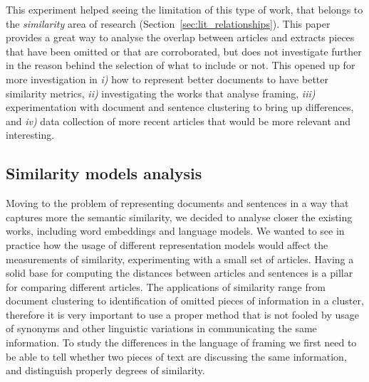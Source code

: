 

This experiment helped seeing the limitation of this type of work, that belongs to the \emph{similarity} area of research (Section~\ref{sec:lit_relationships}).
This paper provides a great way to analyse the overlap between articles and extracts pieces that have been omitted or that are corroborated, but does not investigate further in the reason behind the selection of what to include or not.
This opened up for more investigation in \emph{i)} how to represent better documents to have better similarity metrics, \emph{ii)} investigating the works that analyse framing, \emph{iii)} experimentation with document and sentence clustering to bring up differences, and \emph{iv)} data collection of more recent articles that would be more relevant and interesting.


\subsection{Similarity models analysis}
Moving to the problem of representing documents and sentences in a way that captures more the semantic similarity, we decided to analyse closer the existing works, including word embeddings and language models.
We wanted to see in practice how the usage of different representation models would affect the measurements of similarity, experimenting with a small set of articles. 
Having a solid base for computing the distances between articles and sentences is a pillar for comparing different articles. The applications of similarity range from document clustering to identification of omitted pieces of information in a cluster, therefore it is very important to use a proper method that is not fooled by usage of synonyms and other linguistic variations in communicating the same information. To study the differences in the language of framing we first need to be able to tell whether two pieces of text are discussing the same information, and distinguish properly degrees of similarity.

